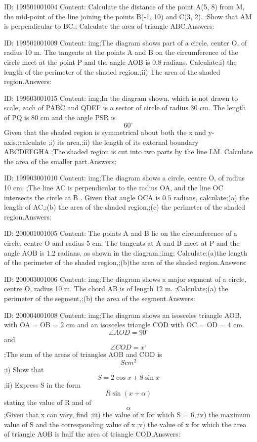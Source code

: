 \documentclass{article}
\begin{document}
ID: 199501001004
Content:
Calculate the distance of the point A(5, 8) from M, the mid-point of the line joining the points B(-1, 10) and C(3, 2). ;Show that AM is perpendicular to BC.; Calculate the area of triangle ABC.Answers:

ID: 199501001009
Content:
img;The diagram shows part of a circle, center O, of radius 10 m. The tangents at the points A and B on the circumference of the circle meet at the point P and the angle AOB is 0.8 radians. Calculate;i)	the length of the perimeter of the shaded region.;ii)	The area of the shaded region.Answers:

ID: 199603001015
Content:
img;In the diagram shown, which is not drawn to scale, each of PABC and QDEF is a sector of circle of radius 30 cm. The length of PQ is 80 cm and the angle PSR is \[60^{\circ}\]Given that the shaded region is symmetrical about both the x and y-axis,;calculate ;i) its area,;ii) the length of its external boundary ABCDEFGHA.;The shaded region is cut into two parts by the line LM. Calculate the area of the smaller part.Answers:

ID: 199903001010
Content:
img;The diagram shows a circle, centre O, of radius 10 cm. ;The line AC is perpendicular to the radius OA, and the line OC intersects the circle at B . Given that angle OCA is 0.5 radians, calculate;(a)	the length of AC,;(b)	the area of the shaded region,;(c)	the perimeter of the shaded region.Answers:

ID: 200001001005
Content:
The points A and B lie on the circumference of a circle, centre O and radius 5 cm. The tangents at A and B meet at P and the angle AOB is 1.2 radians, as shown in the diagram.;img; Calculate;(a)the length of the perimeter of the shaded region,;(b)the area of the shaded region.Answers:

ID: 200003001006
Content:
img;The diagram shows a major segment of a circle, centre O, radius 10 m. The chord AB is of length 12 m. ;Calculate;(a)	the perimeter of the segment,;(b)	the area of the segment.Answers:

ID: 200004001008
Content:
img;The diagram shows an isosceles triangle AOB, with OA = OB = 2 cm and an isosceles triangle COD with OC = OD = 4 cm. \[\angle AOD=90^{\circ}\] and \[\angle COD=x^{\circ}\];The sum of the areas of triangles AOB and COD is \[Scm^2\];i) Show that \[S=2\cos x+8\sin x\];ii) Express S in the form \[R\sin(x+\alpha)\] stating the value of R and of \[\alpha\];Given that x can vary, find ;iii) the value of x for which S = 6,;iv) the maximum value of S and the corresponding value of x.;v) the value of x for which the area of triangle AOB is half the area of triangle COD.Answers:
\end{document}
